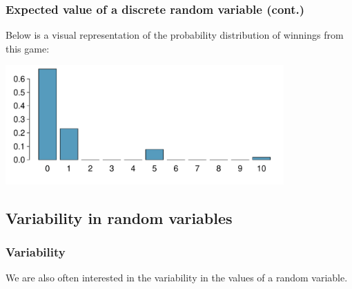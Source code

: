 \begin{frame}
\frametitle{Expected value of a discrete random variable (cont.)}

Below is a visual representation of the probability distribution of winnings from this game:

\begin{center}
\includegraphics[width=0.8\textwidth]{2-4_random_variables/figures/card_game/card_game}
\end{center}

\end{frame}


\subsection{Variability in random variables}


\begin{frame}
\frametitle{Variability}

We are also often interested in the variability in the values of a random variable.

\formula{
\[ \sigma^2 = Var(X) = \sum_{i = 1}^k (x_i - E(X))^2 P(X = x_i) \]
\[ \sigma = SD(X) = \sqrt{Var(X)} \]
}

\end{frame}


